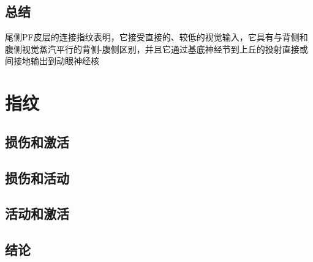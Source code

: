 \subsection{总结}
尾侧PF皮层的连接指纹表明，它接受直接的、较低的视觉输入，它具有与背侧和腹侧视觉蒸汽平行的背侧-腹侧区别，并且它通过基底神经节到上丘的投射直接或间接地输出到动眼神经核

\section{指纹}

\subsection{损伤和激活}

\subsection{损伤和活动}

\subsection{活动和激活}



\subsection{结论}